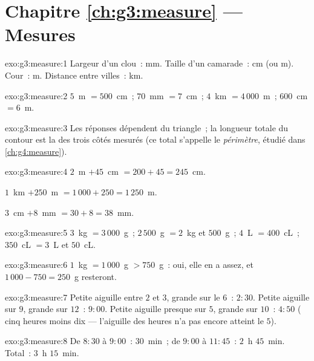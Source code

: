 \section*{Chapitre \ref{ch:g3:measure} --- Mesures}

\begin{solution}{exo:g3:measure:1}
Largeur d'un clou~: mm. Taille d'un camarade~: cm (ou m). Cour~: m.
Distance entre villes~: km.
\end{solution}

\begin{solution}{exo:g3:measure:2}
$5$~m $= 500$~cm~; \quad $70$~mm $= 7$~cm~; \quad
$4$~km $= 4\,000$~m~; \quad $600$~cm $= 6$~m.
\end{solution}

\begin{solution}{exo:g3:measure:3}
Les réponses dépendent du triangle~; la longueur totale du
contour est la  des trois côtés mesurés (ce total
s'appelle le \emph{périmètre}, étudié dans
\cref{ch:g4:measure}).
\end{solution}

\begin{solution}{exo:g3:measure:4}
$2$~m $+ 45$~cm $= 200 + 45 = 245$~cm.

$1$~km $+ 250$~m $= 1\,000 + 250 = 1\,250$~m.

$3$~cm $+ 8$~mm $= 30 + 8 = 38$~mm.
\end{solution}

\begin{solution}{exo:g3:measure:5}
$3$~kg $= 3\,000$~g~; \quad $2\,500$~g $= 2$~kg et $500$~g~; \quad
$4$~L $= 400$~cL~; \quad $350$~cL $= 3$~L et $50$~cL.
\end{solution}

\begin{solution}{exo:g3:measure:6}
$1$~kg $= 1\,000$~g $> 750$~g~: oui, elle en a assez, et
$1\,000 - 750 = 250$~g resteront.
\end{solution}

\begin{solution}{exo:g3:measure:7}
Petite aiguille entre $2$ et $3$, grande sur le $6$~: $2{:}30$.
Petite aiguille sur $9$, grande sur $12$~: $9{:}00$. Petite aiguille
presque sur $5$, grande sur $10$~: $4{:}50$
(\guillemotleft{} cinq heures moins dix \guillemotright{} ---
l'aiguille des heures n'a pas encore atteint le $5$).
\end{solution}

\begin{solution}{exo:g3:measure:8}
De $8{:}30$ à $9{:}00$~: $30$~min~; de $9{:}00$ à $11{:}45$~:
$2$~h $45$~min. Total~: $3$~h $15$~min.
\end{solution}

